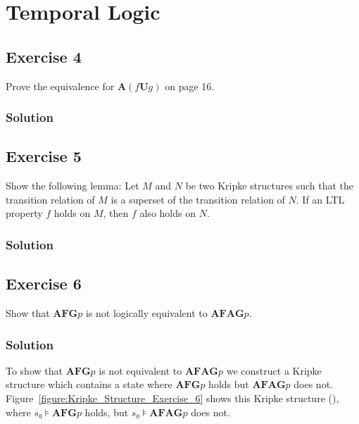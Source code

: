 \documentclass[a4paper, 12pt]{article}
\newcommand{\codeinput}[1]
{
    \begin{leftbar}
        {\fontsize{9pt}{11pt}}
    \end{leftbar}
}
\begin{document}
\codeinput{bdd_to_formula}

\section{Temporal Logic}

\subsection{Exercise 4}

Prove the equivalence for $\mathbf{A}(f \mathbf{U} g)$ on page 16.

\subsubsection{Solution}



\subsection{Exercise 5}

Show the following lemma: Let $M$ and $N$ be two Kripke structures such that
the transition relation of $M$ is a superset of the transition relation of
$N$. If an LTL property $f$ holds on $M$, then $f$ also holds on $N$.

\subsubsection{Solution}



\subsection{Exercise 6}

Show that $\mathbf{AFG} p$ is not logically equivalent to $\mathbf{AFAG} p$.

\subsubsection{Solution}

To show that $\mathbf{AFG} p$ is not equivalent to $\mathbf{AFAG} p$ we
construct a Kripke structure which contains a state where $\mathbf{AFG} p$
holds but $\mathbf{AFAG} p$ does not.
Figure~\ref{figure:Kripke_Structure_Exercise_6} shows this Kripke structure
(\cite{Veith2011ExerciseSolutions}), where $s₀⊧\mathbf{AFG} p$ holds, but
$s₀⊧\mathbf{AFAG} p$ does not.
\end{document}
